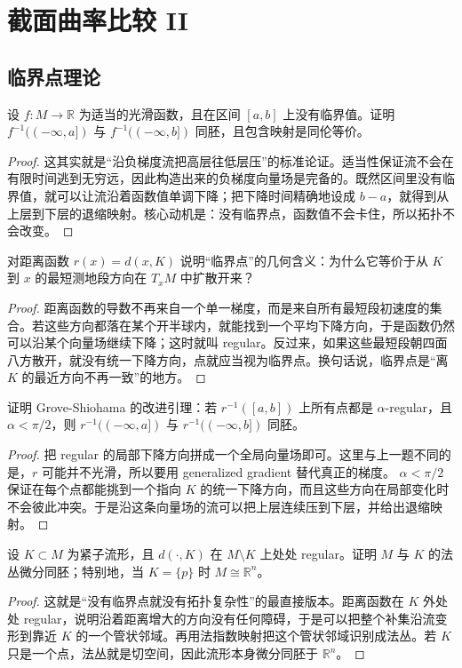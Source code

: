 \documentclass[11pt,a4paper,openany]{ctexbook}
\numberwithin{equation}{chapter}
\begin{document}
\chapter{截面曲率比较 II}

\section{临界点理论}

\begin{problem}
设 \(f\colon M\to \mathbb R\) 为适当的光滑函数，且在区间 \([a,b]\) 上没有临界值。证明 \(f^{-1}((-\infty,a])\) 与 \(f^{-1}((-\infty,b])\) 同胚，且包含映射是同伦等价。
\end{problem}
\begin{proof}
这其实就是“沿负梯度流把高层往低层压”的标准论证。适当性保证流不会在有限时间逃到无穷远，因此构造出来的负梯度向量场是完备的。既然区间里没有临界值，就可以让流沿着函数值单调下降；把下降时间精确地设成 \(b-a\)，就得到从上层到下层的退缩映射。核心动机是：没有临界点，函数值不会卡住，所以拓扑不会改变。  
\end{proof}

\begin{problem}
对距离函数 \(r(x)=d(x,K)\) 说明“临界点”的几何含义：为什么它等价于从 \(K\) 到 \(x\) 的最短测地段方向在 \(T_xM\) 中扩散开来？
\end{problem}
\begin{proof}
距离函数的导数不再来自一个单一梯度，而是来自所有最短段初速度的集合。若这些方向都落在某个开半球内，就能找到一个平均下降方向，于是函数仍然可以沿某个向量场继续下降；这时就叫 regular。反过来，如果这些最短段朝四面八方散开，就没有统一下降方向，点就应当视为临界点。换句话说，临界点是“离 \(K\) 的最近方向不再一致”的地方。  
\end{proof}

\begin{problem}
证明 Grove-Shiohama 的改进引理：若 \(r^{-1}([a,b])\) 上所有点都是 \(\alpha\)-regular，且 \(\alpha<\pi/2\)，则 \(r^{-1}((-\infty,a])\) 与 \(r^{-1}((-\infty,b])\) 同胚。
\end{problem}
\begin{proof}
把 regular 的局部下降方向拼成一个全局向量场即可。这里与上一题不同的是，\(r\) 可能并不光滑，所以要用 generalized gradient 替代真正的梯度。 \(\alpha<\pi/2\) 保证在每个点都能挑到一个指向 \(K\) 的统一下降方向，而且这些方向在局部变化时不会彼此冲突。于是沿这条向量场的流可以把上层连续压到下层，并给出退缩映射。  
\end{proof}

\begin{problem}
设 \(K\subset M\) 为紧子流形，且 \(d(\cdot,K)\) 在 \(M\setminus K\) 上处处 regular。证明 \(M\) 与 \(K\) 的法丛微分同胚；特别地，当 \(K=\{p\}\) 时 \(M\cong \mathbb R^n\)。
\end{problem}
\begin{proof}
这就是“没有临界点就没有拓扑复杂性”的最直接版本。距离函数在 \(K\) 外处处 regular，说明沿着距离增大的方向没有任何障碍，于是可以把整个补集沿流变形到靠近 \(K\) 的一个管状邻域。再用法指数映射把这个管状邻域识别成法丛。若 \(K\) 只是一个点，法丛就是切空间，因此流形本身微分同胚于 \(\mathbb R^n\)。  
\end{proof}
\end{document}
